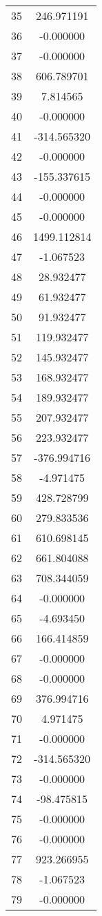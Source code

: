 \documentclass[12pt]{article}
\begin{document}
\begin{longtable}{@{}cc@{}}
35 & 246.971191 \\
36 & -0.000000 \\
37 & -0.000000 \\
38 & 606.789701 \\
39 & 7.814565 \\
40 & -0.000000 \\
41 & -314.565320 \\
42 & -0.000000 \\
43 & -155.337615 \\
44 & -0.000000 \\
45 & -0.000000 \\
46 & 1499.112814 \\
47 & -1.067523 \\
48 & 28.932477 \\
49 & 61.932477 \\
50 & 91.932477 \\
51 & 119.932477 \\
52 & 145.932477 \\
53 & 168.932477 \\
54 & 189.932477 \\
55 & 207.932477 \\
56 & 223.932477 \\
57 & -376.994716 \\
58 & -4.971475 \\
59 & 428.728799 \\
60 & 279.833536 \\
61 & 610.698145 \\
62 & 661.804088 \\
63 & 708.344059 \\
64 & -0.000000 \\
65 & -4.693450 \\
66 & 166.414859 \\
67 & -0.000000 \\
68 & -0.000000 \\
69 & 376.994716 \\
70 & 4.971475 \\
71 & -0.000000 \\
72 & -314.565320 \\
73 & -0.000000 \\
74 & -98.475815 \\
75 & -0.000000 \\
76 & -0.000000 \\
77 & 923.266955 \\
78 & -1.067523 \\
79 & -0.000000 \\

\end{longtable}
\end{document}
